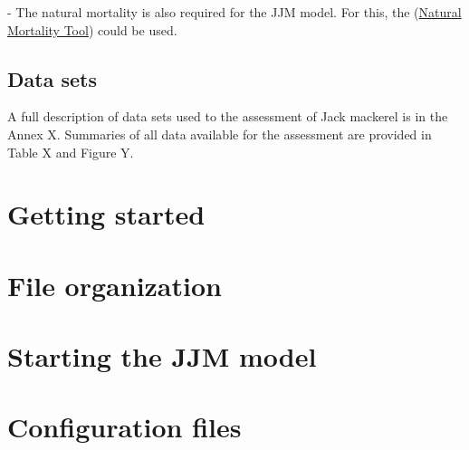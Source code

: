 \documentclass{article}
\begin{document}
- The natural mortality is also required for the JJM model. For this, the (\href{https://connect.fisheries.noaa.gov/natural-mortality-tool/}{Natural Mortality Tool}) could be used. 

\subsection{Data sets}

A full description of data sets used to the assessment of Jack mackerel is in the Annex X. Summaries of all data available for the assessment are provided in Table X and Figure Y.

\section{Getting started} 

\section{File organization}

\section{Starting the JJM model}

\section{Configuration files}
\end{document}
